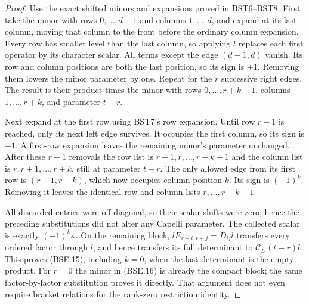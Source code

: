 \documentclass[11pt,a4paper]{article}
\numberwithin{equation}{section}
\theoremstyle{remark}\newtheorem{remark}[theorem]{Remark}
\begin{document}
\begin{proof}
Use the exact shifted minors and expansions proved in BST6--BST8.
First take the minor with rows $0,\ldots,d-1$ and columns
$1,\ldots,d$, and expand at its last column, moving that column
to the front before the ordinary column expansion.
Every row has smaller level than the last column, so applying $l$
replaces each first operator by its character scalar.
All terms except the edge $(d-1,d)$ vanish.
Its row and column positions are both the last position, so its
sign is $+1$.  Removing them lowers the minor parameter by one.
Repeat for the $r$ successive right edges.  The result is their
product times the minor with rows $0,\ldots,r+k-1$, columns
$1,\ldots,r+k$, and parameter $t-r$.

Next expand at the first row using BST7's row expansion.
Until row $r-1$ is reached, only its next left edge survives.
It occupies the first column, so its sign is $+1$.
A first-row expansion leaves the remaining minor's parameter
unchanged.  After these $r-1$ removals the row list is
$r-1,r,\ldots,r+k-1$ and the column list is
$r,r+1,\ldots,r+k$, still at parameter $t-r$.
The only allowed edge from its first row is $(r-1,r+k)$,
which now occupies column position $k$.  Its sign is $(-1)^k$.
Removing it leaves the identical row and column lists
$r,\ldots,r+k-1$.

All discarded entries were off-diagonal, so their scalar shifts
were zero; hence the preceding substitutions did not alter any
Capelli parameter.  The collected scalar is exactly
$(-1)^k\kappa$.  On the remaining block,
$lE_{r+i,r+j}=D_{ij}l$ transfers every ordered factor through $l$,
and hence transfers its full determinant to
$\mathcal C_D(t-r)l$.  This proves (BSE.15), including $k=0$,
when the last determinant is the empty product.
For $r=0$ the minor in (BSE.16) is already the compact block;
the same factor-by-factor substitution proves it directly.
That argument does not even require bracket relations for the
rank-zero restriction identity.
\end{proof}

\end{document}
